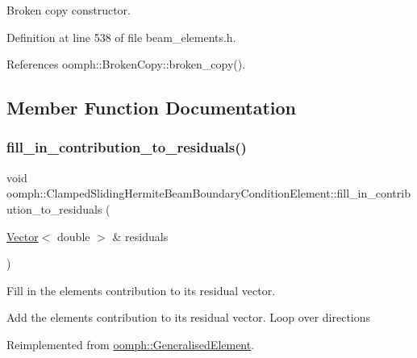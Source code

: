 Broken copy constructor. 



Definition at line 538 of file beam\+\_\+elements.\+h.



References oomph\+::\+Broken\+Copy\+::broken\+\_\+copy().



\subsection{Member Function Documentation}
\mbox{\label{classoomph_1_1ClampedSlidingHermiteBeamBoundaryConditionElement_ab6ff392e4c3d55d7a899ad4360ef8eb3}} 
\subsubsection{\texorpdfstring{fill\+\_\+in\+\_\+contribution\+\_\+to\+\_\+residuals()}{fill\_in\_contribution\_to\_residuals()}}
{\footnotesize\ttfamily void oomph\+::\+Clamped\+Sliding\+Hermite\+Beam\+Boundary\+Condition\+Element\+::fill\+\_\+in\+\_\+contribution\+\_\+to\+\_\+residuals (\begin{DoxyParamCaption}\item[{\hyperlink{classoomph_1_1Vector}{Vector}$<$ double $>$ \&}]{residuals }\end{DoxyParamCaption})\hspace{0.3cm}{\ttfamily [virtual]}}



Fill in the element\textquotesingle{}s contribution to its residual vector. 

Add the element\textquotesingle{}s contribution to its residual vector. Loop over directions 

Reimplemented from \hyperlink{classoomph_1_1GeneralisedElement_a310c97f515e8504a48179c0e72c550d7}{oomph\+::\+Generalised\+Element}.



